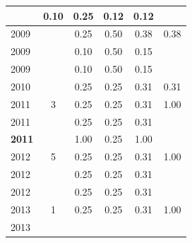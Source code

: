 \begin{table}[H]
\begin{tabular}{| l | c | c | c | c | c |}
          &
          0.10
          &
          0.25
          &
          0.12
          &
            {\color{red} 0.12}
          \\
\hline
            2009
          &
          
          &
          0.25
          &
          0.50
          &
          0.38
          &
            {\color{red} 0.38}
          \\
            2009
          &
          
          &
          0.10
          &
          0.50
          &
          0.15
          &
          \\
            2009
          &
          
          &
          0.10
          &
          0.50
          &
          0.15
          &
          \\
\hline
            2010
          &
          
          &
          0.25
          &
          0.25
          &
          0.31
          &
            {\color{red} 0.31}
          \\
\hline
            2011
          &
          3
          &
          0.25
          &
          0.25
          &
          0.31
          &
            {\color{blue} 1.00}
          \\
            2011
          &
          
          &
          0.25
          &
          0.25
          &
          0.31
          &
          \\
            {\bf 2011}
          &
          
          &
          1.00
          &
          0.25
          &
          1.00
          &
          \\
\hline
            2012
          &
          5
          &
          0.25
          &
          0.25
          &
          0.31
          &
            {\color{blue} 1.00}
          \\
            2012
          &
          
          &
          0.25
          &
          0.25
          &
          0.31
          &
          \\
            2012
          &
          
          &
          0.25
          &
          0.25
          &
          0.31
          &
          \\
\hline
            2013
          &
          1
          &
          0.25
          &
          0.25
          &
          0.31
          &
            {\color{blue} 1.00}
          \\
            2013
          &
          

\end{tabular}
\end{table}
